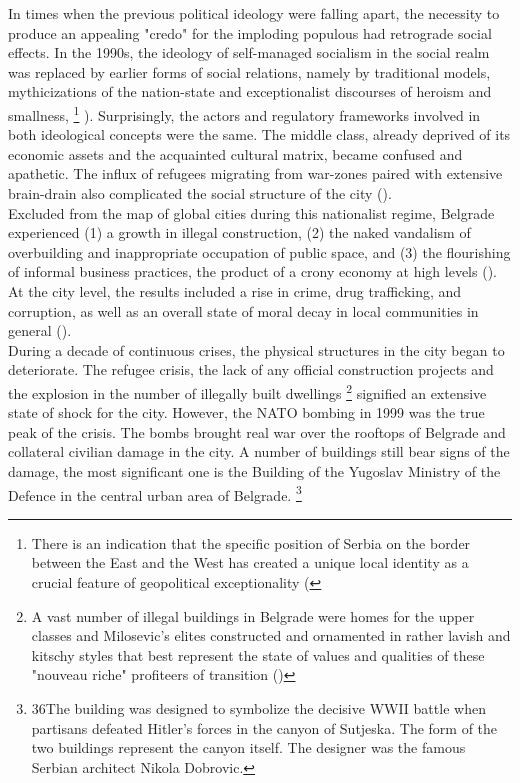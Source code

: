 \documentclass[11pt]{report}
\begin{document}
In times when the previous political ideology were falling apart, the necessity to produce an appealing "credo" for the imploding populous had retrograde social effects. In the 1990s, the ideology of self-managed socialism in the social realm was replaced by earlier forms of social relations, namely by traditional models, mythicizations of the nation-state and exceptionalist discourses of heroism and smallness,
\footnote{There is an indication that the specific position of Serbia on the border between the East and the West has created a unique local identity as a crucial feature of geopolitical exceptionality (\href{Savic}{\citealt{savic_where_2014}}}
\href{Doytchinov}{\citealt{doytchinov_belgrade_2015}}). 
Surprisingly, the actors and regulatory frameworks involved in both ideological concepts were the same.
The middle class, already deprived of its economic assets and the acquainted cultural matrix, became confused and apathetic.
The influx of refugees migrating from war-zones paired with extensive brain-drain also complicated the social structure of the city (\href{Doytchinov}{\citealt{doytchinov_urban_2015}}).
\\

Excluded from the map of global cities during this nationalist regime, Belgrade experienced (1) a growth in illegal construction, (2) the naked vandalism of overbuilding and inappropriate occupation of public space, and (3) the flourishing of informal business practices, the product of a crony economy at high levels (\href{Norris}{\citealt{norris_belgrade_2008}}).
At the city level, the results included a rise in crime, drug trafficking, and corruption, as well as an overall state of moral decay in local communities in general  (\href{Prodanovic}{\citealt{prodanovic_stariji_2004}}).
\\

During a decade of continuous crises, the physical structures in the city began to deteriorate.
The refugee crisis, the lack of any official construction projects and the explosion in the number of illegally built dwellings
\footnote{A vast number of illegal buildings in Belgrade were homes for the upper classes and Milosevic's elites constructed and ornamented in rather lavish and kitschy styles that best represent the state of values and qualities of these "nouveau riche" profiteers of transition (\href{Hirt}{\citealt{hirt_belgrade_2009}})}
signified an extensive state of shock for the city.
However, the NATO bombing in 1999 was the true peak of the crisis. The bombs brought real war over the rooftops of Belgrade and collateral civilian damage in the city. A number of buildings still bear signs of the damage, the most significant one is the Building of the Yugoslav Ministry of the Defence in the central urban area of Belgrade. 
\footnote{36The building was designed to symbolize the decisive WWII battle when partisans defeated Hitler’s forces in the canyon of Sutjeska. The form of the two buildings represent the canyon itself. The designer was the famous Serbian architect Nikola Dobrovic.}
\\
\end{document}
